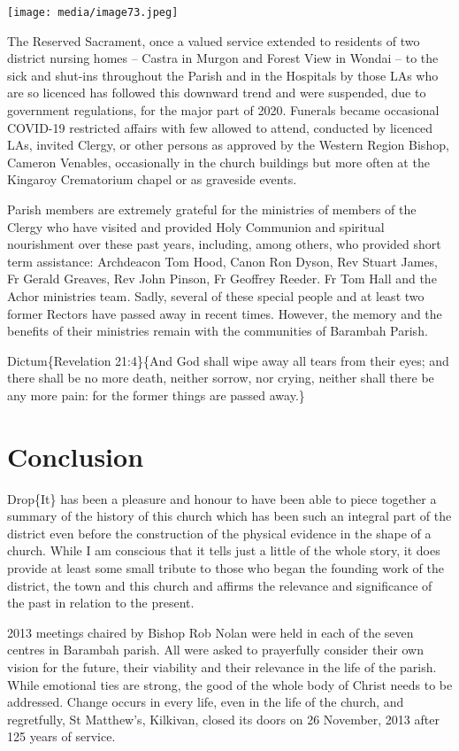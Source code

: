 \texttt{[image: media/image73.jpeg]}

The Reserved Sacrament, once a valued service extended to residents of two district nursing homes -- Castra in Murgon and Forest View in Wondai -- to the sick and shut-ins throughout the Parish and in the Hospitals by those LAs who are so licenced has followed this downward trend and were suspended, due to government regulations, for the major part of 2020. Funerals became occasional COVID-19 restricted affairs with few allowed to attend, conducted by licenced LAs, invited Clergy, or other persons as approved by the Western Region Bishop, Cameron Venables, occasionally in the church buildings but more often at the Kingaroy Crematorium chapel or as graveside events.

Parish members are extremely grateful for the ministries of members of the Clergy who have visited and provided Holy Communion and spiritual nourishment over these past years, including, among others, who provided short term assistance: Archdeacon Tom Hood, Canon Ron Dyson, Rev Stuart James, Fr Gerald Greaves, Rev John Pinson, Fr Geoffrey Reeder. Fr Tom Hall and the Achor ministries team\emph{.} Sadly, several of these special people and at least two former Rectors have passed away in recent times. However, the memory and the benefits of their ministries remain with the communities of Barambah Parish.

Dictum\{Revelation 21:4\}\{And God shall wipe away all tears from their eyes; and there shall be no more death, neither sorrow, nor crying, neither shall there be any more pain: for the former things are passed away.\}

\hypertarget{conclusion}{%
\chapter{Conclusion}\label{conclusion}}

Drop\{It\} has been a pleasure and honour to have been able to piece together a summary of the history of this church which has been such an integral part of the district even before the construction of the physical evidence in the shape of a church. While I am conscious that it tells just a little of the whole story, it does provide at least some small tribute to those who began the founding work of the district, the town and this church and affirms the relevance and significance of the past in relation to the present.

2013 meetings chaired by Bishop Rob Nolan were held in each of the seven centres in Barambah parish. All were asked to prayerfully consider their own vision for the future, their viability and their relevance in the life of the parish. While emotional ties are strong, the good of the whole body of Christ needs to be addressed. Change occurs in every life, even in the life of the church, and regretfully, St Matthew's, Kilkivan, closed its doors on 26 November, 2013 after 125 years of service.

